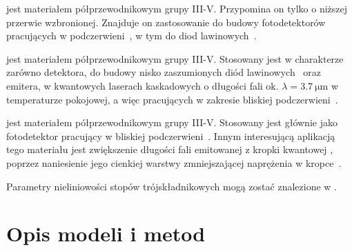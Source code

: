 \documentclass[12pt,openany,a4paper]{book}
\begin{document}
 jest materiałem półprzewodnikowym grupy III-V. Przypomina on  tylko o niższej
przerwie wzbronionej. Znajduje on zastosowanie do budowy fotodetektorów pracujących w podczerwieni~\autocite{Law1981}, w tym do diod lawinowych~\autocite{Hildebrand1980,Hildebrand1981}.


 jest materiałem półprzewodnikowym grupy III-V. Stosowany jest w charakterze zarówno detektora, do budowy
nisko zaszumionych diód lawinowych~\autocite{Tan2012} oraz emitera, w kwantowych laserach kaskadowych o długości fali ok. \(\lambda = \SI{3.7}{\micro\metre}\)
w temperaturze pokojowej, a więc pracujących w zakresie bliskiej podczerwieni~\autocite{Yang2006}.

 jest materiałem półprzewodnikowym grupy III-V. Stosowany jest głównie jako
fotodetektor pracujący w bliskiej podczerwieni~\autocite{Sun2002,Li2015}. Innym interesującą aplikacją
tego materiału jest zwiększenie długości fali emitowanej z kropki kwantowej , poprzez
naniesienie jego cienkiej warstwy zmniejszającej naprężenia w kropce~\autocite{Liu2005}.



Parametry nieliniowości stopów trójskładnikowych mogą zostać znalezione w \textcite{Vurgaftman2001,Linnik2000,Adachi1989,Adachi2017,Mozume2008}.



	

\chapter{Opis modeli i metod}\label{chapt:methods}
\end{document}
